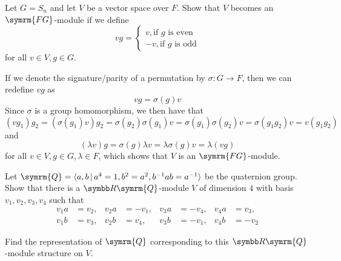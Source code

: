 \begin{exercise}
Let \(G = S_n\) and let \(V\) be a vector space over \(F\). Show that \(V\) becomes an \(\symrm{FG}\)-module if we define
\[
    vg = \begin{cases}
        v, \text{if } g \text{ is even} \\
        -v, \text{if } g \text{ is odd}
    \end{cases}
\]
for all \(v \in V, g \in G\).
\end{exercise}
\begin{solution}
If we denote the signature/parity of a permutation by \(\sigma \colon G \to F\), then we can redefine \(vg\) as
\[
    vg = \sigma(g) v
\]
Since \(\sigma\) is a group homomorphism, we then have that
\[
    (v g_1) g_2 = (\sigma(g_1) v) g_2 = \sigma(g_2) \sigma(g_1) v = \sigma(g_1) \sigma(g_2) v = \sigma(g_1 g_2) v = v (g_1 g_2)
\]
and
\[
    (\lambda v) g = \sigma(g) \lambda v = \lambda \sigma(g) v = \lambda (v g)
\]
for all \(v \in V, g \in G, \lambda \in F\), which shows that \(V\) is an \(\symrm{FG}\)-module.
\end{solution}

\begin{exercise}
Let \(\symrm{Q} = \braket{a, b \vbar a^4 = 1, b^2 = a^2, b^{-1} a b = a^{-1}}\) be the quaternion group. Show that there is a \(\reals \symrm{Q}\)-module \(V\) of dimension \(4\) with basis \(v_1, v_2, v_3, v_4\) such that
\begin{align*}
    v_1 a &= v_2, &v_2 a &= - v_1, &v_3 a &= - v_4, &v_4 a &= v_3, \\
    v_1 b &= v_3, &v_2 b &= v_4, &v_3 b &= - v_1, &v_4 b &= - v_2
\end{align*}

Find the representation of \(\symrm{Q}\) corresponding to this \(\reals \symrm{Q}\)-module structure on \(V\).
\end{exercise}

